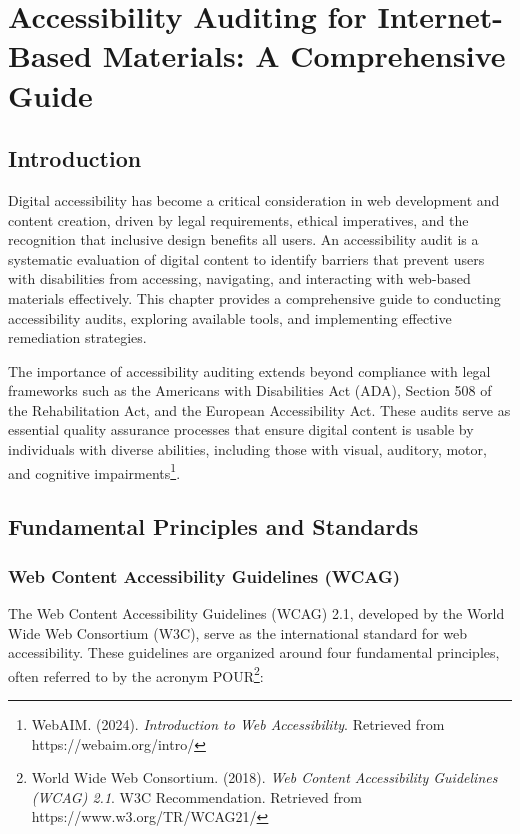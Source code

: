\chapter{Accessibility Auditing for Internet-Based Materials: A Comprehensive Guide}
\label{chap:accessibility-auditing}

\section{Introduction}
\label{sec:intro-audit}

Digital accessibility has become a critical consideration in web development and content creation, driven by legal requirements, ethical imperatives, and the recognition that inclusive design benefits all users. An accessibility audit is a systematic evaluation of digital content to identify barriers that prevent users with disabilities from accessing, navigating, and interacting with web-based materials effectively. This chapter provides a comprehensive guide to conducting accessibility audits, exploring available tools, and implementing effective remediation strategies.

The importance of accessibility auditing extends beyond compliance with legal frameworks such as the Americans with Disabilities Act (ADA), Section 508 of the Rehabilitation Act, and the European Accessibility Act. These audits serve as essential quality assurance processes that ensure digital content is usable by individuals with diverse abilities, including those with visual, auditory, motor, and cognitive impairments\footnote{WebAIM. (2024). \textit{Introduction to Web Accessibility}. Retrieved from https://webaim.org/intro/}.

\section{Fundamental Principles and Standards}
\label{sec:principles-standards}

\subsection{Web Content Accessibility Guidelines (WCAG)}

The Web Content Accessibility Guidelines (WCAG) 2.1, developed by the World Wide Web Consortium (W3C), serve as the international standard for web accessibility. These guidelines are organized around four fundamental principles, often referred to by the acronym POUR\footnote{World Wide Web Consortium. (2018). \textit{Web Content Accessibility Guidelines (WCAG) 2.1}. W3C Recommendation. Retrieved from https://www.w3.org/TR/WCAG21/}:

